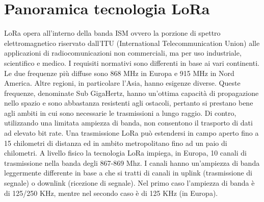 \documentclass[12pt,a4paper,openright,twoside]{report}
\begin{document}
\section{Panoramica tecnologia LoRa}
LoRa opera all'interno della banda ISM ovvero la porzione di spettro elettromagnetico riservato dall'ITU (International Telecommunication Union) alle applicazioni di radiocomunicazioni non commerciali, ma per uso industriale, scientifico e medico.
I requisiti normativi sono differenti in base ai vari continenti. Le due frequenze pi\`u diffuse sono 868 MHz in Europa e 915 MHz in Nord America. Altre regioni, in particolare l'Asia, hanno esigenze diverse. 
Queste frequenze, denominate Sub GigaHertz, hanno un'ottima capacit\`a di propagazione nello spazio e sono abbastanza resistenti agli ostacoli, pertanto si prestano bene agli ambiti in cui sono necessarie le trasmissioni a lungo raggio. Di contro, utilizzando una limitata ampiezza di banda, non consentono il trasporto di dati ad elevato bit rate.   
Una trasmissione LoRa pu\`o estendersi in campo aperto fino a 15 chilometri di distanza ed in ambito metropolitano fino ad un paio di chilometri. \cite{K20}
A livello fisico la tecnologia LoRa impiega, in Europa, 10 canali di trasmissione nella banda degli 867-869 Mhz. I canali hanno un'ampiezza di banda leggermente differente in base a che si tratti di canali in uplink (trasmissione di segnale) o downlink (ricezione di segnale). 
Nel primo caso l'ampiezza di banda \`e di 125/250 KHz, mentre nel secondo caso \`e di 125 KHz (in Europa).   
\end{document}
